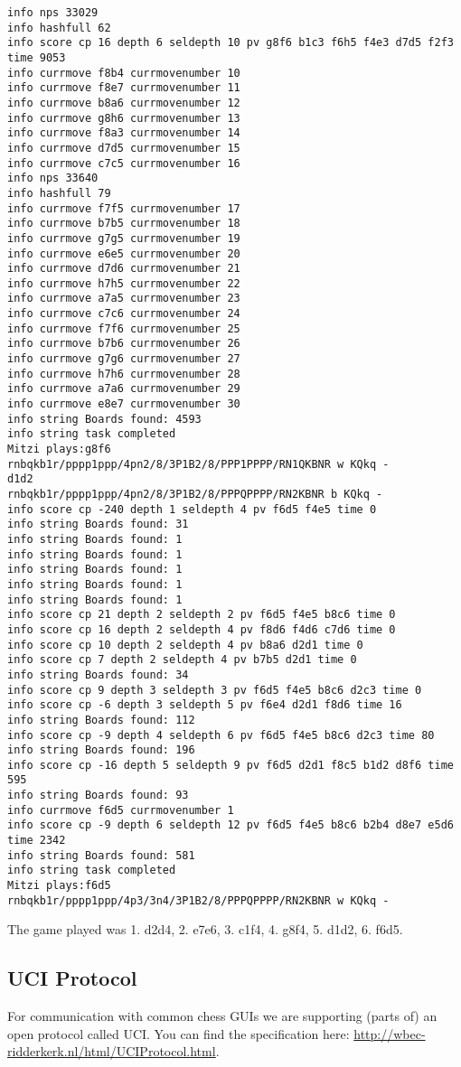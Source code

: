 \documentclass [12pt ,a4paper, english]{scrartcl}
\theoremstyle{plain}
\theoremstyle{definition}
\theoremstyle{remark}
\begin{document}
\begin{lstlisting}
info nps 33029
info hashfull 62
info score cp 16 depth 6 seldepth 10 pv g8f6 b1c3 f6h5 f4e3 d7d5 f2f3 time 9053
info currmove f8b4 currmovenumber 10
info currmove f8e7 currmovenumber 11
info currmove b8a6 currmovenumber 12
info currmove g8h6 currmovenumber 13
info currmove f8a3 currmovenumber 14
info currmove d7d5 currmovenumber 15
info currmove c7c5 currmovenumber 16
info nps 33640
info hashfull 79
info currmove f7f5 currmovenumber 17
info currmove b7b5 currmovenumber 18
info currmove g7g5 currmovenumber 19
info currmove e6e5 currmovenumber 20
info currmove d7d6 currmovenumber 21
info currmove h7h5 currmovenumber 22
info currmove a7a5 currmovenumber 23
info currmove c7c6 currmovenumber 24
info currmove f7f6 currmovenumber 25
info currmove b7b6 currmovenumber 26
info currmove g7g6 currmovenumber 27
info currmove h7h6 currmovenumber 28
info currmove a7a6 currmovenumber 29
info currmove e8e7 currmovenumber 30
info string Boards found: 4593
info string task completed
Mitzi plays:g8f6
rnbqkb1r/pppp1ppp/4pn2/8/3P1B2/8/PPP1PPPP/RN1QKBNR w KQkq -
d1d2
rnbqkb1r/pppp1ppp/4pn2/8/3P1B2/8/PPPQPPPP/RN2KBNR b KQkq -
info score cp -240 depth 1 seldepth 4 pv f6d5 f4e5 time 0
info string Boards found: 31
info string Boards found: 1
info string Boards found: 1
info string Boards found: 1
info string Boards found: 1
info string Boards found: 1
info score cp 21 depth 2 seldepth 2 pv f6d5 f4e5 b8c6 time 0
info score cp 16 depth 2 seldepth 4 pv f8d6 f4d6 c7d6 time 0
info score cp 10 depth 2 seldepth 4 pv b8a6 d2d1 time 0
info score cp 7 depth 2 seldepth 4 pv b7b5 d2d1 time 0
info string Boards found: 34
info score cp 9 depth 3 seldepth 3 pv f6d5 f4e5 b8c6 d2c3 time 0
info score cp -6 depth 3 seldepth 5 pv f6e4 d2d1 f8d6 time 16
info string Boards found: 112
info score cp -9 depth 4 seldepth 6 pv f6d5 f4e5 b8c6 d2c3 time 80
info string Boards found: 196
info score cp -16 depth 5 seldepth 9 pv f6d5 d2d1 f8c5 b1d2 d8f6 time 595
info string Boards found: 93
info currmove f6d5 currmovenumber 1
info score cp -9 depth 6 seldepth 12 pv f6d5 f4e5 b8c6 b2b4 d8e7 e5d6 time 2342
info string Boards found: 581
info string task completed
Mitzi plays:f6d5
rnbqkb1r/pppp1ppp/4p3/3n4/3P1B2/8/PPPQPPPP/RN2KBNR w KQkq -
\end{lstlisting}
The game played was 1. d2d4, 2. e7e6, 3. c1f4, 4. g8f4, 5. d1d2, 6. f6d5.

\subsection{UCI Protocol}
For communication with common chess GUIs we are supporting (parts of) an open protocol called UCI.
You can find the specification here: \url{http://wbec-ridderkerk.nl/html/UCIProtocol.html}.
\end{document}
